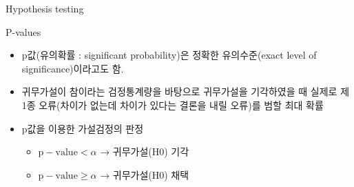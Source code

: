 \documentclass[9pt,ignorenonframetext,xcolor=dvipsnames]{beamer}
\providecommand{\tightlist}{%
  \setlength{\itemsep}{0pt}\setlength{\parskip}{0pt}}
\newlength{\wideitemsep}
\let\olditem\item
\renewcommand{\item}{\setlength{\itemsep}{\wideitemsep}\olditem}
\begin{document}
\begin{frame}{Hypothesis testing}

\begin{block}{P-values}

\begin{itemize}
\tightlist
\item
  p값(유의확률 : significant probability)은 정확한 유의수준(exact level
  of significance)이라고도 함.
\item
  귀무가설이 참이라는 검정통계량을 바탕으로 귀무가설을 기각하였을 때
  실제로 제 1종 오류(차이가 없는데 차이가 있다는 결론을 내릴 오류)를
  범할 최대 확률
\item
  p값을 이용한 가설검정의 판정

  \begin{itemize}
  \tightlist
  \item
    \(\mathrm{p-value} < \alpha\) → 귀무가설(H0) 기각
  \item
    \(\mathrm{p-value} \geq \alpha\) → 귀무가설(H0) 채택
  \end{itemize}
\end{itemize}

\end{block}

\end{frame}
\end{document}
